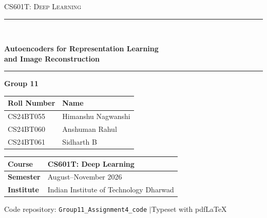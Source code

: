 \documentclass[11pt,a4paper]{article}
\newcommand{\code}[1]{\texttt{#1}}
\begin{document}
\begin{titlepage}
\centering
\vspace*{1em}
{\large\scshape CS601T: Deep Learning\par}\vspace{0.2em}{\normalsize Programming Assignment 4\par}
\vspace{1.2em}\rule{\linewidth}{1.0pt}\\[0.6em]
{\LARGE\bfseries Autoencoders for Representation Learning\\[0.2em] and Image Reconstruction\par}
\vspace{0.6em}\rule{\linewidth}{1.0pt}\vspace{2.4em}
{\large\bfseries Group 11\par}\vspace{0.8em}
\begin{tabular}{@{}ll@{}}
\toprule\textbf{Roll Number} & \textbf{Name} \\ \midrule
CS24BT055 & Himanshu Nagwanshi \\
CS24BT060 & Anshuman Rahul \\
CS24BT061 & Sidharth B \\
\bottomrule
\end{tabular}
\vspace{2.4em}
\begin{tabular}{@{}ll@{}}
\toprule\textbf{Course} & CS601T: Deep Learning \\ \midrule
\textbf{Semester} & August--November 2026 \\
\textbf{Institute} & Indian Institute of Technology Dharwad \\
\bottomrule
\end{tabular}
\vfill
{\small Code repository: \code{Group11\_Assignment4\_code} \quad$\vert$\quad Typeset with pdf\LaTeX\par}
\vspace{1em}
\end{titlepage}
\end{document}
